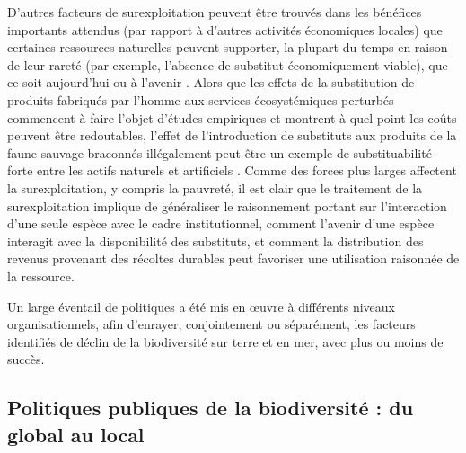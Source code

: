 D'autres facteurs de surexploitation peuvent être trouvés dans les bénéfices importants attendus (par rapport à d'autres activités économiques locales) que certaines ressources naturelles peuvent supporter, la plupart du temps en raison de leur rareté (par exemple, l'absence de substitut économiquement viable), que ce soit aujourd'hui ou à l'avenir \citep{Kremer2000}.  Alors que les effets de la substitution de produits fabriqués par l'homme aux services écosystémiques perturbés commencent à faire l'objet d'études empiriques \citep{frank_economic_2024} et montrent à quel point les coûts peuvent être redoutables, l'effet de l'introduction de substituts aux produits de la faune sauvage braconnés illégalement peut être un exemple de substituabilité forte entre les actifs naturels et artificiels \citep{chen_economics_2017}. Comme des forces plus larges affectent la surexploitation, y compris la pauvreté, il est clair que le traitement de la surexploitation implique de généraliser le raisonnement portant sur  l'interaction d'une seule espèce avec le cadre institutionnel, comment l'avenir d'une espèce interagit avec la disponibilité des substituts, et comment la distribution des revenus provenant des récoltes durables peut favoriser une utilisation raisonnée de la ressource. 
	
Un large éventail de politiques a été mis en œuvre à différents niveaux organisationnels, afin d'enrayer, conjointement ou séparément, les facteurs identifiés de déclin de la biodiversité sur terre et en mer, avec plus ou moins de succès. 

{}
\subsection*{Politiques publiques de la biodiversité : du global au local}
\par

